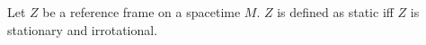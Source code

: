 Let $Z$ be a reference frame on a spacetime $M$. $Z$ is defined as static iff $Z$ is stationary and irrotational.
